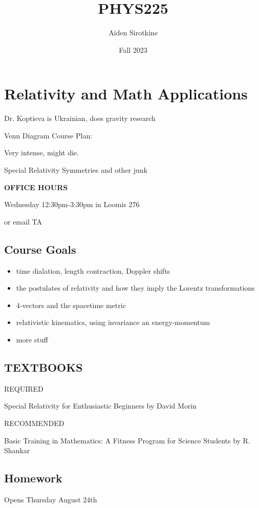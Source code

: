\documentclass{report}
\date{Fall 2023}
\title{PHYS225}
\author{Aiden Sirotkine}
\begin{document}
\pagestyle{fancy}
\maketitle
\tableofcontents
\clearpage

\chapter{Relativity and Math Applications}
Dr. Koptieva is Ukrainian, does gravity research

Venn Diagram Course Plan:

Very intense, might die. 

Special Relativity \hspace{1cm} Symmetries and other junk \hspace{1cm}

\textbf{OFFICE HOURS}

Wednesday 12:30pm-3:30pm in Loomis 276

or email TA

\section*{Course Goals}
\begin{itemize}
\item time dialation, length contraction, Doppler shifts
\item the postulates of relativity and how they imply the Lorentz transformations
\item 4-vectors and the spacetime metric
\item relativistic kinematics, using invariance an energy-momentum 

\item more stuff
\end{itemize}

\section{TEXTBOOKS}
REQUIRED

Special Relativity for Enthusiastic Beginners by David Morin

RECOMMENDED

Basic Training in Mathematics: A Fitness Program for Science Students by R. Shankar

\section{Homework}
Opens Thursday August 24th
\end{document}

